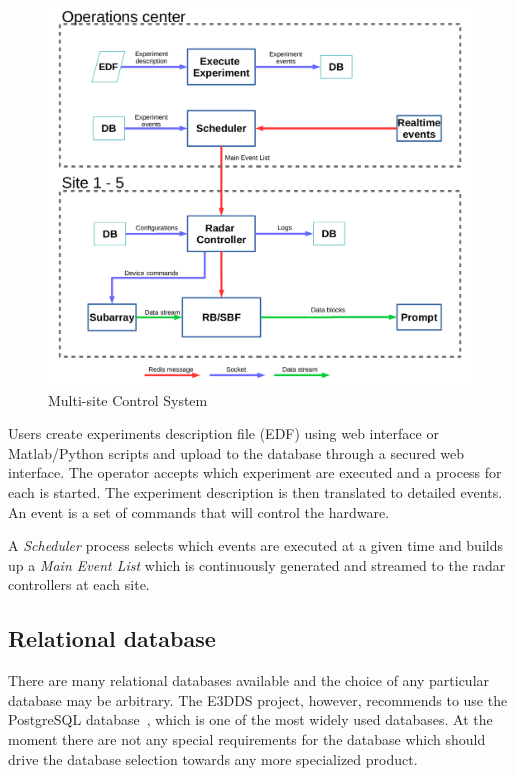\documentclass[12pt,a4paper]{article}
\begin{document}
\begin{figure}[h!]
\centering
\includegraphics[scale=0.4]{do2_figure2.png}
\caption{Multi-site Control System \label{fig-control-sys}}
\end{figure}

Users create experiments description file (EDF) using web interface or Matlab/Python scripts and upload to the \ED  database through a secured web interface. 
The operator accepts which experiment are executed and a process for each is started. 
The experiment description is then translated to detailed events. 
An event is a set of commands that will control the \ED hardware. 

A \emph{Scheduler} process selects which events are executed at a given time and builds up a {\emph{Main Event List}} which is continuously generated and streamed to the radar controllers at each site.  

\subsection{Relational database}

There are many relational databases available and the choice of any particular database may be arbitrary.
The E3DDS project, however, recommends to use the PostgreSQL database~\cite{postgresql}, which is one of the most widely used databases. 
At the moment there are not any special requirements for the database which should drive the database selection towards any more specialized product.
\end{document}
